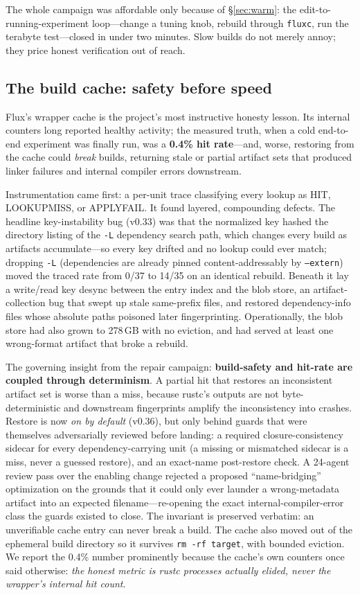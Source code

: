 The whole campaign was affordable only because of \S\ref{sec:warm}: the edit-to-running-experiment loop---change a tuning knob, rebuild through \texttt{fluxc}, run the terabyte test---closed in under two minutes. Slow builds do not merely annoy; they price honest verification out of reach.

\subsection{The build cache: safety before speed}

Flux's wrapper cache is the project's most instructive honesty lesson. Its internal counters long reported healthy activity; the measured truth, when a cold end-to-end experiment was finally run, was a \textbf{0.4\% hit rate}---and, worse, restoring from the cache could \emph{break} builds, returning stale or partial artifact sets that produced linker failures and internal compiler errors downstream.

Instrumentation came first: a per-unit trace classifying every lookup as HIT, LOOKUPMISS, or APPLYFAIL. It found layered, compounding defects. The headline key-instability bug (v0.33) was that the normalized key hashed the directory listing of the \texttt{-L} dependency search path, which changes every build as artifacts accumulate---so every key drifted and no lookup could ever match; dropping \texttt{-L} (dependencies are already pinned content-addressably by \texttt{--extern}) moved the traced rate from 0/37 to 14/35 on an identical rebuild. Beneath it lay a write/read key desync between the entry index and the blob store, an artifact-collection bug that swept up stale same-prefix files, and restored dependency-info files whose absolute paths poisoned later fingerprinting. Operationally, the blob store had also grown to 278\,GB with no eviction, and had served at least one wrong-format artifact that broke a rebuild.

The governing insight from the repair campaign: \textbf{build-safety and hit-rate are coupled through determinism}. A partial hit that restores an inconsistent artifact set is worse than a miss, because rustc's outputs are not byte-deterministic and downstream fingerprints amplify the inconsistency into crashes. Restore is now \emph{on by default} (v0.36), but only behind guards that were themselves adversarially reviewed before landing: a required closure-consistency sidecar for every dependency-carrying unit (a missing or mismatched sidecar is a miss, never a guessed restore), and an exact-name post-restore check. A 24-agent review pass over the enabling change rejected a proposed ``name-bridging'' optimization on the grounds that it could only ever launder a wrong-metadata artifact into an expected filename---re-opening the exact internal-compiler-error class the guards existed to close. The invariant is preserved verbatim: an unverifiable cache entry can never break a build. The cache also moved out of the ephemeral build directory so it survives \texttt{rm -rf target}, with bounded eviction. We report the 0.4\% number prominently because the cache's own counters once said otherwise: \emph{the honest metric is rustc processes actually elided, never the wrapper's internal hit count}.

